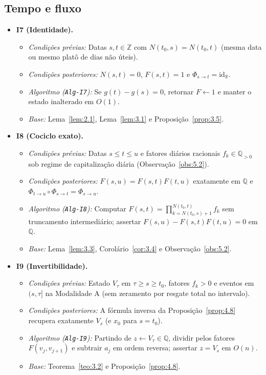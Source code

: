 \documentclass[11pt, a4paper]{article}
\theoremstyle{definition}
\theoremstyle{plain}
\theoremstyle{remark}
\begin{document}
\subsection{Tempo e fluxo}

\begin{itemize}
    \item \textbf{I7 (Identidade).}
    \begin{itemize}
        \item \emph{Condições prévias:} Datas $s, t \in \mathbb{Z}$ com $N(t_0, s) = N(t_0, t)$ (mesma data ou mesmo platô de dias não úteis).
        \item \emph{Condições posteriores:} $N(s,t) = 0$, $F(s,t) = 1$ e $\Phi_{s \to t} = \mathrm{id}_{\mathbb{R}}$.
        \item \emph{Algoritmo (\texttt{Alg-I7}):} Se $g(t) - g(s) = 0$, retornar $F \leftarrow 1$ e manter o estado inalterado em $O(1)$.
        \item \emph{Base:} Lema~\ref{lem:2.1}, Lema~\ref{lem:3.1} e Proposição~\ref{prop:3.5}.
    \end{itemize}

    \item \textbf{I8 (Cociclo exato).}
    \begin{itemize}
        \item \emph{Condições prévias:} Datas $s \le t \le u$ e fatores diários racionais $f_k \in \mathbb{Q}_{>0}$ sob regime de capitalização diária (Observação~\ref{obs:5.2}).
        \item \emph{Condições posteriores:} $F(s,u) = F(s,t)F(t,u)$ exatamente em $\mathbb{Q}$ e $\Phi_{t \to u} \circ \Phi_{s \to t} = \Phi_{s \to u}$.
        \item \emph{Algoritmo (\texttt{Alg-I8}):} Computar $F(s,t) = \prod_{k=N(t_0,s)+1}^{N(t_0,t)} f_k$ sem truncamento intermediário; assertar $F(s,u) - F(s,t)F(t,u) = 0$ em $\mathbb{Q}$.
        \item \emph{Base:} Lema~\ref{lem:3.3}, Corolário~\ref{cor:3.4} e Observação~\ref{obs:5.2}.
    \end{itemize}

    \item \textbf{I9 (Invertibilidade).}
    \begin{itemize}
        \item \emph{Condições prévias:} Estado $V_\tau$ em $\tau \ge s \ge t_0$, fatores $f_k > 0$ e eventos em $(s, \tau]$ na Modalidade A (sem zeramento por resgate total no intervalo).
        \item \emph{Condições posteriores:} A fórmula inversa da Proposição~\ref{prop:4.8} recupera exatamente $V_s$ (e $x_0$ para $s = t_0$).
        \item \emph{Algoritmo (\texttt{Alg-I9}):} Partindo de $z \leftarrow V_\tau \in \mathbb{Q}$, dividir pelos fatores $F(v_j, v_{j+1})$ e subtrair $a_j$ em ordem reversa; assertar $z = V_s$ em $O(n)$.
        \item \emph{Base:} Teorema~\ref{teo:3.2} e Proposição~\ref{prop:4.8}.
    \end{itemize}


\end{itemize}
\end{document}
